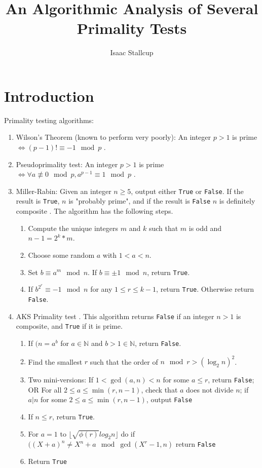 \documentclass[10pt,a4paper,final]{article}
\author{Isaac Stallcup}
\title{An Algorithmic Analysis of Several Primality Tests}
\newcommand{\False}[0]{\texttt{False}}
\newcommand{\True}[0]{\texttt{True}}
\begin{document}
\maketitle	
\clearpage
\section{Introduction}

Primality testing algorithms:
\begin{enumerate}
	\item Wilson's Theorem (known to perform very poorly): An integer $p > 1$ is prime $\iff (p-1)! \equiv -1 \mod p$ \cite{stein2008elementary}.
	\item Pseudoprimality test: An integer $p > 1$ is prime $\iff \forall a \not\equiv 0 \mod p, a^{p-1} \equiv 1 \mod p$ \cite{stein2008elementary}.
	\item Miller-Rabin: Given an integer $n \ge 5$, output either \True{}  or \False{}. If the result is \True{}, $n$ is "probably prime", and if the result is \False{} $n$ is definitely composite \cite{stein2008elementary}. The algorithm has the following steps.
	\begin{enumerate}
		\item Compute the unique integers $m$ and $k$ such that $m$ is odd and $n-1 = 2^{k}*m$.
		\item Choose some random $a$ with $1 < a < n$.
		\item Set $b \equiv a^{m} \mod n$. If $b \equiv \pm1 \mod n$, return \True{}.
		\item If $b^{2^{r}} \equiv -1 \mod n$ for any $1 \le r \le k-1$, return \True{}. Otherwise return \False{}.
	\end{enumerate}
	\item AKS Primality test \cite{agrawal2004primes}. This algorithm returns \False{} if an integer $n > 1$ is composite, and \True{} if it is prime.
	\begin{enumerate}
		\item If $(n = a^{b}$ for $a \in \mathbb{N}$ and $b > 1 \in \mathbb{N}$, return \False{}.
		\item Find the smallest $r$ such that the order of $n\mod r > (\log_2 n)^2$.
		\item Two mini-versions:
			\subitem If $1 < \gcd(a,n) < n$ for some $a \le r$, return \False{}; OR
			\subitem For all $2 \le a \le \min(r,n-1)$, check that $a$ does not divide $n$; if $a|n$ for some $2 \le a \le \min(r,n-1)$, output \False{}
		\item If $n \le r$, return \True{}.
		\item For $a = 1$ to $\lfloor \sqrt{\phi(r)}log_2 n \rfloor$ do
			\subitem	if $((X+a)^n \ne X^n + a \mod \gcd(X^r -1,n)$ return \False{}
		\item Return \True{}
	\end{enumerate}
	
\end{enumerate}
\end{document}
